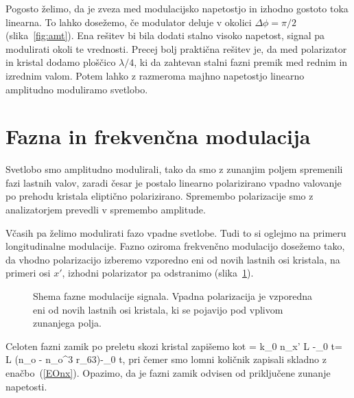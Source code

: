 Pogosto želimo, da je zveza med modulacijsko napetostjo in izhodno
gostoto toka linearna. To lahko dosežemo, če modulator deluje v okolici $\Delta\phi=\pi/2$
(slika~\ref{fig:amt}).
Ena rešitev bi bila dodati stalno visoko napetost, signal pa modulirati okoli
te vrednosti. Precej bolj praktična rešitev je, da med polarizator
in kristal dodamo ploščico $\lambda/4$, ki da zahtevan stalni
fazni premik med rednim in izrednim valom. Potem lahko z razmeroma majhno napetostjo
linearno amplitudno moduliramo svetlobo.

\section{Fazna in frekvenčna modulacija}
Svetlobo smo amplitudno modulirali, tako da smo z zunanjim
poljem spremenili fazi lastnih valov, zaradi česar je postalo linearno
polarizirano vpadno valovanje po prehodu kristala eliptično polarizirano.
Spremembo polarizacije smo z analizatorjem prevedli v spremembo amplitude.

Včasih pa želimo modulirati fazo vpadne svetlobe. Tudi to si oglejmo na primeru longitudinalne
 modulacije. Fazno oziroma frekvenčno modulacijo dosežemo tako,
da vhodno polarizacijo izberemo vzporedno eni od novih lastnih osi kristala, 
na primeri osi $x'$, izhodni polarizator pa odstranimo (slika~\ref{fig:fmshema}). 
\begin{figure}[h]
\centering
\def\svgwidth{80truemm} 

\caption{Shema fazne modulacije signala. Vpadna polarizacija je vzporedna eni od 
novih lastnih osi kristala, ki se pojavijo pod vplivom zunanjega polja.}
\label{fig:fmshema}
\end{figure}

Celoten fazni zamik po preletu skozi kristal zapišemo kot 
\beq
\phi =  k_0 n_{x'} L -\omega_0 t= L \left(n_o -
n_o^3 r_{63}\right)-\omega_0 t,
\label{fmphi}
\eeq
pri čemer smo lomni količnik zapisali skladno z enačbo~(\ref{EOnx}). Opazimo,
da je fazni zamik odvisen od priključene zunanje napetosti.

